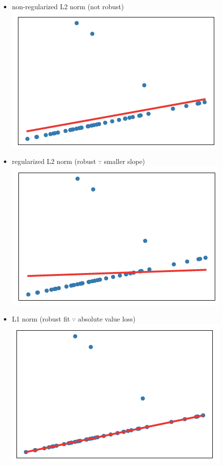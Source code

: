 \documentclass[10pt,landscape,a4paper]{article}
\begin{document}
\begin{multicols*}{5}
\begin{itemize}
    \item non-regularized L2 norm (not robust) \\
    \includegraphics[scale=0.3]{non_regularized_l2_norm}
    \item regularized L2 norm (robust \(\because \) smaller slope) \\
    \includegraphics[scale=0.3]{regularized_l2_norm}
    \item L1 norm (robust fit \(\because \) absolute value loss) \\
    \includegraphics[scale=0.3]{l1_norm}
\end{itemize}


\end{multicols*}
\end{document}
